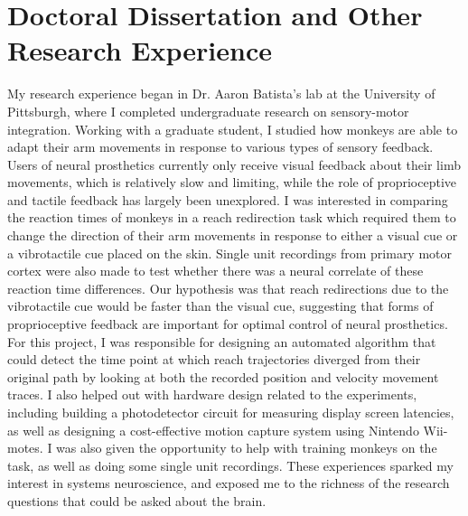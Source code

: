 \documentclass[11pt,notitlepage]{article}
\begin{document}
\section*{Doctoral Dissertation and Other Research Experience}
My research experience began in Dr. Aaron Batista's lab at the University of Pittsburgh, where I completed undergraduate research on sensory-motor integration. Working with a graduate student, I studied how monkeys are able to adapt their arm movements in response to various types of sensory feedback. Users of neural prosthetics currently only receive visual feedback about their limb movements, which is relatively slow and limiting, while the role of proprioceptive and tactile feedback has largely been unexplored. I was interested in comparing the reaction times of monkeys in a reach redirection task which required them to change the direction of their arm movements in response to either a visual cue or a vibrotactile cue placed on the skin. Single unit recordings from primary motor cortex were also made to test whether there was a neural correlate of these reaction time differences. Our hypothesis was that reach redirections due to the vibrotactile cue would be faster than the visual cue, suggesting that forms of proprioceptive feedback are important for optimal control of neural prosthetics. For this project, I was responsible for designing an automated algorithm that could detect the time point at which reach trajectories diverged from their original path by looking at both the recorded position and velocity movement traces. I also helped out with hardware design related to the experiments, including building a photodetector circuit for measuring display screen latencies, as well as designing a cost-effective motion capture system using Nintendo Wii-motes. I was also given the opportunity to help with training monkeys on the task, as well as doing some single unit recordings. These experiences sparked my interest in systems neuroscience, and exposed me to the richness of the research questions that could be asked about the brain.
\end{document}

